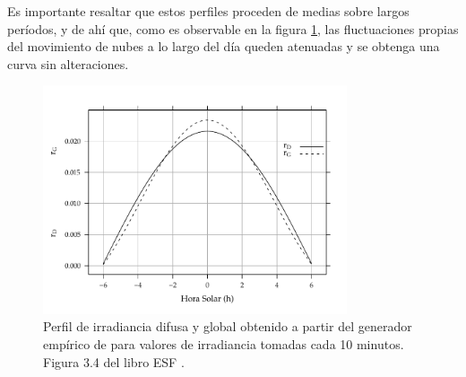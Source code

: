Es importante resaltar que estos perfiles proceden de medias sobre largos períodos, y de ahí que, como es observable en la figura \ref{fig:org40e632b}, las fluctuaciones propias del movimiento de nubes a lo largo del día queden atenuadas y se obtenga una curva sin alteraciones.
\begin{figure}[htbp]
\centering
\includegraphics[keepaspectratio,width=0.8\textwidth,height=0.5\textheight]{figuras/RgRd.pdf}
\caption{\label{fig:org40e632b}Perfil de irradiancia difusa y global obtenido a partir del generador empírico de \cite{Collares-Pereira.Rabl1979} para valores de irradiancia tomadas cada 10 minutos. Figura 3.4 del libro ESF \cite{Perpinan2023}.}
\end{figure}

